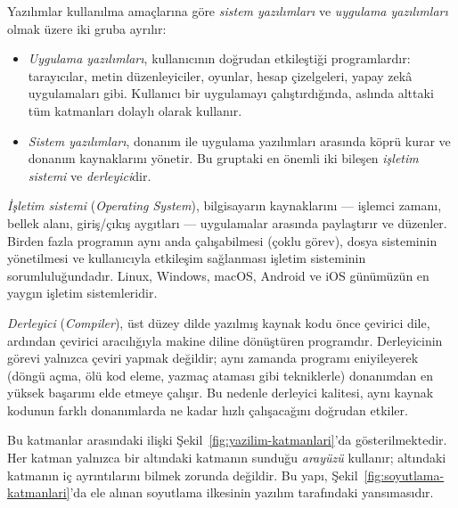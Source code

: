 Yazılımlar kullanılma amaçlarına göre \emph{sistem yazılımları} ve \emph{uygulama yazılımları} olmak üzere iki gruba ayrılır:

\begin{itemize}[nosep, leftmargin=*]
    \item \emph{Uygulama yazılımları}, kullanıcının doğrudan etkileştiği programlardır: tarayıcılar, metin düzenleyiciler, oyunlar, hesap çizelgeleri, yapay zekâ uygulamaları gibi. Kullanıcı bir uygulamayı çalıştırdığında, aslında alttaki tüm katmanları dolaylı olarak kullanır.
    \item \emph{Sistem yazılımları}, donanım ile uygulama yazılımları arasında köprü kurar ve donanım kaynaklarını yönetir. Bu gruptaki en önemli iki bileşen \emph{işletim sistemi} ve \emph{derleyici}dir.
\end{itemize}

\emph{İşletim sistemi} (\emph{Operating System}), bilgisayarın kaynaklarını --- işlemci zamanı, bellek alanı, giriş/çıkış aygıtları --- uygulamalar arasında paylaştırır ve düzenler. Birden fazla programın aynı anda çalışabilmesi (çoklu görev), dosya sisteminin yönetilmesi ve kullanıcıyla etkileşim sağlanması işletim sisteminin sorumluluğundadır. Linux, Windows, macOS, Android ve iOS günümüzün en yaygın işletim sistemleridir.

\emph{Derleyici} (\emph{Compiler}), üst düzey dilde yazılmış kaynak kodu önce çevirici dile, ardından çevirici aracılığıyla makine diline dönüştüren programdır. Derleyicinin görevi yalnızca çeviri yapmak değildir; aynı zamanda programı eniyileyerek (döngü açma, ölü kod eleme, yazmaç ataması gibi tekniklerle) donanımdan en yüksek başarımı elde etmeye çalışır. Bu nedenle derleyici kalitesi, aynı kaynak kodunun farklı donanımlarda ne kadar hızlı çalışacağını doğrudan etkiler.

Bu katmanlar arasındaki ilişki Şekil~\ref{fig:yazilim-katmanlari}'da gösterilmektedir. Her katman yalnızca bir altındaki katmanın sunduğu \emph{arayüzü} kullanır; altındaki katmanın iç ayrıntılarını bilmek zorunda değildir. Bu yapı, Şekil~\ref{fig:soyutlama-katmanlari}'da ele alınan soyutlama ilkesinin yazılım tarafındaki yansımasıdır.

